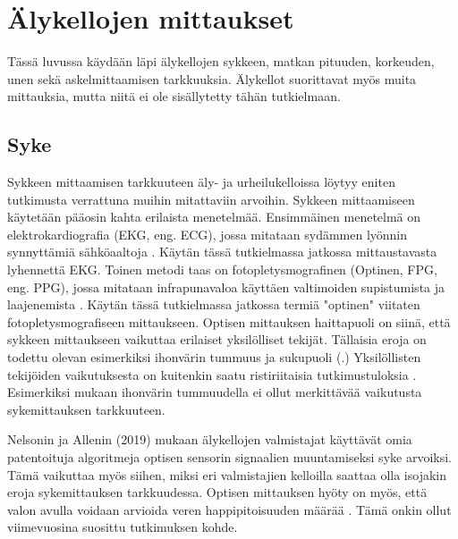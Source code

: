 \documentclass[utf8,bachelor,finnish]{bachelor}
\begin{document}
  \chapter{Älykellojen mittaukset}
  Tässä luvussa käydään läpi älykellojen sykkeen, matkan pituuden, korkeuden, unen sekä askelmittaamisen tarkkuuksia.
   Älykellot suorittavat myös muita mittauksia, mutta niitä ei ole sisällytetty tähän tutkielmaan.\\


  \section{Syke}
  Sykkeen mittaamisen tarkkuuteen äly- ja urheilukelloissa löytyy eniten tutkimusta verrattuna muihin mitattaviin arvoihin.
   Sykkeen mittaamiseen käytetään pääosin kahta erilaista menetelmää. Ensimmäinen menetelmä on elektrokardiografia (EKG, eng. ECG), jossa mitataan sydämmen lyönnin
   synnyttämiä sähköaaltoja \parencite{noauthor_heart_nodate}. Käytän tässä tutkielmassa jatkossa mittaustavasta lyhennettä EKG.
    Toinen metodi taas on fotopletysmografinen (Optinen, FPG, eng. PPG), jossa mitataan infrapunavaloa käyttäen valtimoiden supistumista ja laajenemista \parencite{noauthor_heart_nodate}.
      Käytän tässä tutkielmassa jatkossa termiä "optinen" viitaten fotopletysmografiseen
      mittaukseen. Optisen mittauksen haittapuoli on siinä, että sykkeen mittaukseen vaikuttaa erilaiset yksilölliset tekijät.
       Tällaisia eroja on todettu olevan esimerkiksi ihonvärin tummuus ja sukupuoli (\cite{shcherbina_accuracy_2017,hochstadt_continuous_2020}.)
       Yksilöllisten tekijöiden vaikutuksesta on kuitenkin saatu ristiriitaisia tutkimustuloksia \parencite{pasadyn_accuracy_2019}.
        Esimerkiksi \textcite{sanudo_pilot_2019, bent_investigating_2020} mukaan ihonvärin tummuudella ei ollut merkittävää vaikutusta sykemittauksen tarkkuuteen.
      
      
      Nelsonin ja Allenin (2019) mukaan älykellojen valmistajat käyttävät omia patentoituja algoritmeja optisen sensorin
       signaalien muuntamiseksi syke arvoiksi. Tämä vaikuttaa myös siihen, miksi eri valmistajien kelloilla saattaa olla isojakin eroja
        sykemittauksen tarkkuudessa. Optisen mittauksen hyöty on myös, että valon avulla voidaan arvioida veren happipitoisuuden määrää \parencite{noauthor_heart_nodate}.
         Tämä onkin ollut viimevuosina suosittu tutkimuksen kohde.\\
\end{document}

